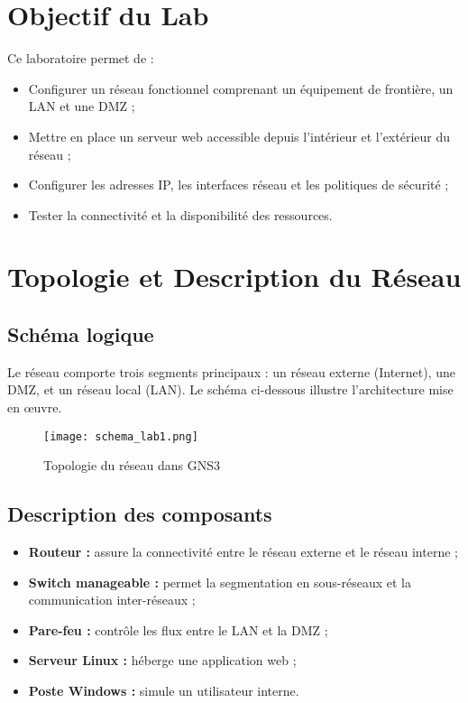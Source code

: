 \documentclass[a4paper,12pt]{report}
\begin{document}
\chapter{Objectif du Lab}
Ce laboratoire permet de :
\begin{itemize}
    \item Configurer un réseau fonctionnel comprenant un équipement de frontière, un LAN et une DMZ ;
    \item Mettre en place un serveur web accessible depuis l’intérieur et l’extérieur du réseau ;
    \item Configurer les adresses IP, les interfaces réseau et les politiques de sécurité ;
    \item Tester la connectivité et la disponibilité des ressources.
\end{itemize}

\chapter{Topologie et Description du Réseau}
\section{Schéma logique}
\noindent
Le réseau comporte trois segments principaux : un réseau externe (Internet), une DMZ, et un réseau local (LAN). 
Le schéma ci-dessous illustre l’architecture mise en œuvre.

\begin{figure}[h!]
    \centering
    \texttt{[image: schema\_lab1.png]}
    \caption{Topologie du réseau dans GNS3}
\end{figure}

\section{Description des composants}
\begin{itemize}
    \item \textbf{Routeur :} assure la connectivité entre le réseau externe et le réseau interne ;
    \item \textbf{Switch manageable :} permet la segmentation en sous-réseaux et la communication inter-réseaux ;
    \item \textbf{Pare-feu :} contrôle les flux entre le LAN et la DMZ ;
    \item \textbf{Serveur Linux :} héberge une application web ;
    \item \textbf{Poste Windows :} simule un utilisateur interne.
\end{itemize}
\end{document}
